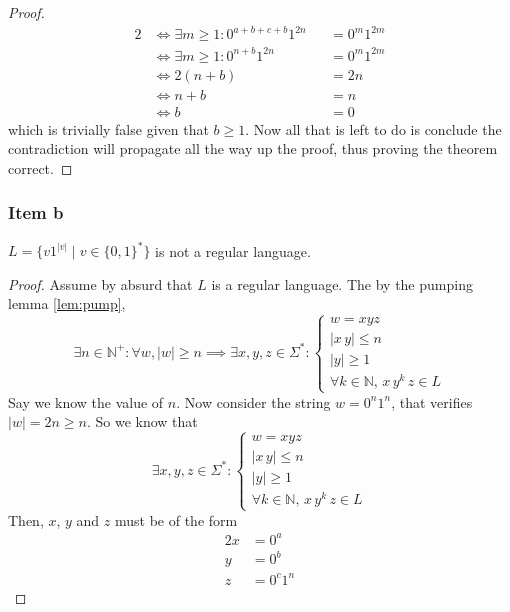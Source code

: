 {\begin{proof}
\begin{alignat*}{2}
	& \iff \exists m \geq 1 \colon 0^{a+b+c+b}1^{2n}   &&= 0^m1^{2m} \\
	& \iff \exists m \geq 1 \colon 0^{n+b}1^{2n}       &&= 0^m1^{2m} \\
	& \iff 2(n+b)                                      &&= 2n\\
	& \iff n+b                                         &&= n\\
	& \iff b                                           &&= 0
\end{alignat*}
which is trivially false given that $b \geq 1$. Now all that is left to do is conclude the contradiction will propagate all the way up the proof, thus proving the theorem correct.
\end{proof}
\pagebreak
\subsubsection{Item b}
\begin{theorem}
$L=\{v1^{|v|}\mid v \in \{0,1\}^*\}$ is not a regular language.
\end{theorem}
\begin{proof}
Assume  by absurd that $L$ is a regular language. The by the pumping lemma \eqref{lem:pump},
\begin{equation*}
	\exists n \in \mathbb{N}^+ \colon \forall w, |w|\geq n \implies \exists x, y, z \in \Sigma^* \colon 
	\begin{cases}
		w = xyz \\
		|x\,y| \leq n\\
		|y| \geq 1\\
		\forall k \in \mathbb{N},\,x\,y^k\,z \in L
\end{cases}
\end{equation*}
Say we know the value of $n$. Now consider the string $w=0^n1^n$, that verifies $|w|=2n \geq n$. So we know that
\begin{equation*}
\exists x, y, z \in \Sigma^* \colon 
\begin{cases}
	w = xyz \\
	|x\,y| \leq n\\
	|y| \geq 1\\
	\forall k \in \mathbb{N},\,x\,y^k\,z \in L
\end{cases}
\end{equation*}
Then, $x$, $y$ and $z$ must be of the form
\begin{alignat*}{2}
	x &= 0^a\\
	y &= 0^b\\
	z &= 0^c1^{n}

\end{alignat*}
\end{proof}}

